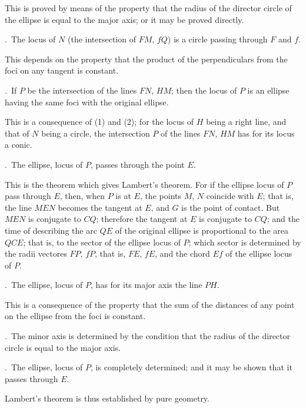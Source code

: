 \documentclass[11pt,a4paper]{article}
\newcommand{\mypar}{\par\medskip\noindent}
\begin{document}
\mypar
This is proved by means of the property that the radius of the director circle
of the ellipse is equal to the major axis; or it may be proved directly.

\mypar
2.~The locus of $N$ (the intersection of $FM$, $fQ$) is a circle passing
through $F$ and $f$.

\mypar
This depends on the property that the product of the perpendiculars from the
foci on any tangent is constant.

\mypar
3.~If $P$ be the intersection of the lines $FN$, $HM$; then the locus of $P$
is an ellipse having the same foci with the original ellipse.

\mypar
This is a consequence of (1) and (2); for the locus of $H$ being a right line,
and that of $N$ being a circle, the intersection $P$ of the lines $FN$, $HM$
has for its locus a conic.

\mypar
4.~The ellipse, locus of $P$, passes through the point $E$.

\mypar
This is the theorem which gives Lambert's theorem. For if the ellipse locus
of $P$ pass through $E$, then, when $P$ is at $E$, the points $M$, $N$ coincide
with $E$; that is, the line $MEN$ becomes the tangent at $E$, and $G$ is the
point of contact. But $MEN$ is conjugate to $CQ$; therefore the tangent at $E$
is conjugate to $CQ$; and the time of describing the arc $QE$ of the original
ellipse is proportional to the area $QCE$; that is, to the sector of the
ellipse locus of $P$; which sector is determined by the radii vectores $FP$,
$fP$, that is, $FE$, $fE$, and the chord $Ef$ of the ellipse locus of $P$.

\mypar
5.~The ellipse, locus of $P$, has for its major axis the line $PH$.

\mypar
This is a consequence of the property that the sum of the distances of any
point on the ellipse from the foci is constant.

\mypar
6.~The minor axis is determined by the condition that the radius of the
director circle is equal to the major axis.

\mypar
7.~The ellipse, locus of $P$, is completely determined; and it may be shown
that it passes through $E$.

\mypar
Lambert's theorem is thus established by pure geometry.

\clearpage

\end{document}
